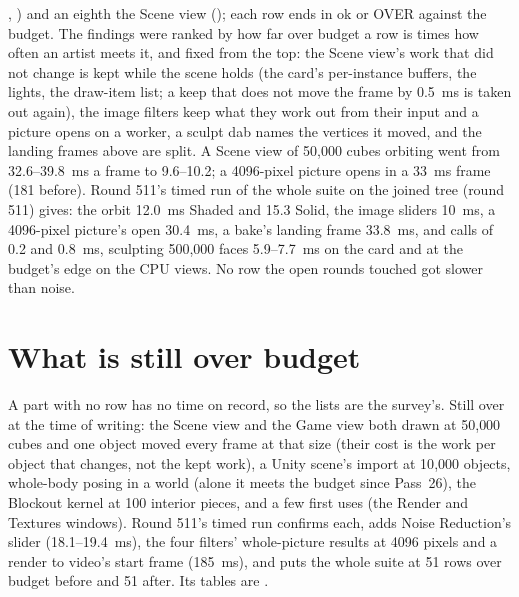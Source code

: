 \begin{itemize}
    , ) and an eighth the Scene view (); each row ends in ok or
    OVER against the budget. The findings were ranked by how far over budget a row is times how often an artist meets
    it, and fixed from the top: the Scene view's work that did not change is kept while the scene holds (the card's
    per-instance buffers, the lights, the draw-item list; a keep that does not move the frame by 0.5~ms is taken out
    again), the image filters keep what they work out from their input and a picture opens on a worker, a sculpt dab
    names the vertices it moved, and the landing frames above are split. A Scene view of 50{,}000 cubes orbiting went from
    32.6--39.8~ms a frame to 9.6--10.2; a 4096-pixel picture opens in a 33~ms frame (181 before). Round 511's timed run of
    the whole suite on the joined tree (round 511) gives: the orbit 12.0~ms Shaded and 15.3 Solid, the image sliders
    10~ms, a 4096-pixel picture's open 30.4~ms, a bake's landing frame 33.8~ms,  and
     calls of 0.2 and 0.8~ms, sculpting 500{,}000 faces 5.9--7.7~ms on the card and at the budget's edge
    on the CPU views. No row the open rounds touched got slower than noise.
\end{itemize}

\section{What is still over budget}
A part with no row has no time on record, so the lists are the survey's. Still over at the time of writing: the Scene
view and the Game view both drawn at 50{,}000 cubes and one object moved every frame at that size (their cost is the work per
object that changes, not the kept work), a Unity scene's import at 10{,}000 objects, whole-body posing in a world (alone it meets the budget since Pass~26), the Blockout
kernel at 100 interior pieces, and a few first uses (the Render and Textures windows). Round 511's timed run confirms
each, adds Noise Reduction's slider (18.1--19.4~ms), the four filters' whole-picture results at 4096 pixels and a render
to video's start frame (185~ms), and puts the whole suite at 51 rows over budget before and 51 after. Its tables are .
